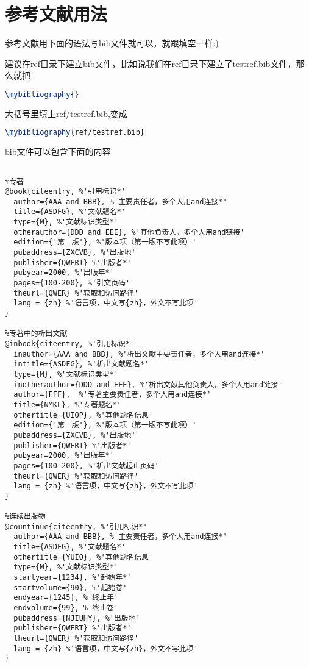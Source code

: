 \section{参考文献用法}
\label{ch4}
参考文献用下面的语法写bib文件就可以，就跟填空一样:)\par
建议在ref目录下建立bib文件，比如说我们在ref目录下建立了testref.bib文件，那么就把
\begin{lstlisting}[language=tex,frame=single]
\mybibliography{}
\end{lstlisting}
大括号里填上ref/testref.bib,变成
\begin{lstlisting}[language=tex,frame=single]
\mybibliography{ref/testref.bib}
\end{lstlisting}
bib文件可以包含下面的内容
\begin{lstlisting}[escapeinside='',frame=single]
%'下面提到的项，带*的是必有的，其他的选填'

%专著
@book{citeentry, %'引用标识*'
  author={AAA and BBB}, %'主要责任者，多个人用and连接*'
  title={ASDFG}, %'文献题名*'
  type={M}, %'文献标识类型*'
  otherauthor={DDD and EEE}, %'其他负责人，多个人用and链接'
  edition={'第二版'}, %'版本项（第一版不写此项）'
  pubaddress={ZXCVB}, %'出版地'
  publisher={QWERT} %'出版者*'
  pubyear=2000, %'出版年*'
  pages={100-200}, %'引文页码'
  theurl={QWER} %'获取和访问路径'
  lang = {zh} %'语言项，中文写{zh}，外文不写此项'
}

%专著中的析出文献
@inbook{citeentry, %'引用标识*'
  inauthor={AAA and BBB}, %'析出文献主要责任者，多个人用and连接*'
  intitle={ASDFG}, %'析出文献题名*'
  type={M}, %'文献标识类型*'
  inotherauthor={DDD and EEE}, %'析出文献其他负责人，多个人用and链接'
  author={FFF},  %'专著主要责任者，多个人用and连接*'
  title={NMKL}, %'专著题名*'
  othertitle={UIOP}, %'其他题名信息'
  edition={'第二版'}, %'版本项（第一版不写此项）'
  pubaddress={ZXCVB}, %'出版地'
  publisher={QWERT} %'出版者*'
  pubyear=2000, %'出版年*'
  pages={100-200}, %'析出文献起止页码'
  theurl={QWER} %'获取和访问路径'
  lang = {zh} %'语言项，中文写{zh}，外文不写此项'
}

%连续出版物
@countinue{citeentry, %'引用标识*'
  author={AAA and BBB}, %'主要责任者，多个人用and连接*'
  title={ASDFG}, %'文献题名*'
  othertitle={YUIO}, %'其他题名信息'
  type={M}, %'文献标识类型*'
  startyear={1234}, %'起始年*'
  startvolume={90}, %'起始卷'
  endyear={1245}, %'终止年'
  endvolume={99}, %'终止卷'
  pubaddress={NJIUHY}, %'出版地'
  publisher={QWERT} %'出版者*'
  theurl={QWER} %'获取和访问路径'
  lang = {zh} %'语言项，中文写{zh}，外文不写此项'
}


\end{lstlisting}
